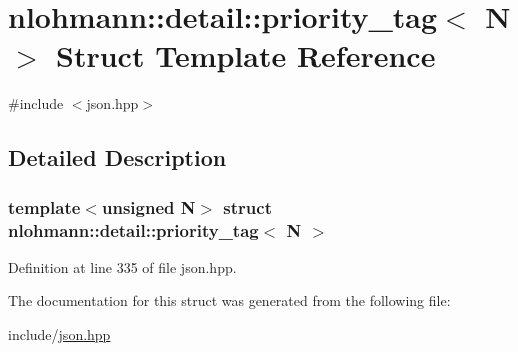 \hypertarget{structnlohmann_1_1detail_1_1priority__tag}{}\section{nlohmann\+:\+:detail\+:\+:priority\+\_\+tag$<$ N $>$ Struct Template Reference}
\label{structnlohmann_1_1detail_1_1priority__tag}


{\ttfamily \#include $<$json.\+hpp$>$}



\subsection{Detailed Description}
\subsubsection*{template$<$unsigned N$>$\newline
struct nlohmann\+::detail\+::priority\+\_\+tag$<$ N $>$}



Definition at line 335 of file json.\+hpp.



The documentation for this struct was generated from the following file\+:\begin{DoxyCompactItemize}
\item 
include/\hyperlink{json_8hpp}{json.\+hpp}\end{DoxyCompactItemize}
